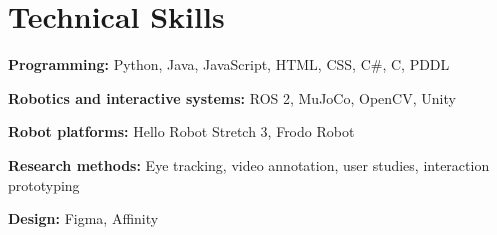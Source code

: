 \documentclass[10pt,letterpaper]{article}
\begin{document}
\section{Technical Skills}
\textbf{Programming:} Python, Java, JavaScript, HTML, CSS, C\#, C, PDDL\par
\textbf{Robotics and interactive systems:} ROS 2, MuJoCo, OpenCV, Unity\par
\textbf{Robot platforms:} Hello Robot Stretch 3, Frodo Robot\par
\textbf{Research methods:} Eye tracking, video annotation, user studies, interaction prototyping\par
\textbf{Design:} Figma, Affinity
\end{document}
